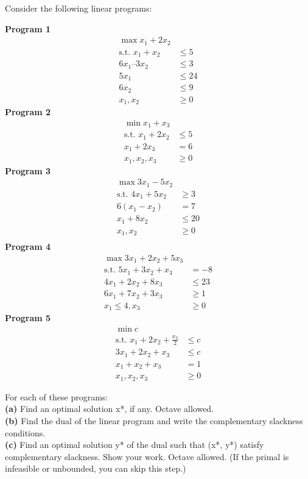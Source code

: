 \documentclass[fleqn]{homework}
\begin{document}
  \begin{problem}{2}
    \begin{question}
      Consider the following linear programs:
      \begin{multicols}{3}
      \noindent \textbf{Program 1}
      \begin{align*}
        \max x_1 + 2x_2 & \\
        \text{s.t.  } x_1 + x_2 &\le 5 \\
        6x_1 – 3x_2 &\le3 \\
        5x_1 &\le 24 \\
        6x_2 &\le 9 \\
        x_1, x_2 &\ge 0
      \end{align*}
      \textbf{Program 2}
      \begin{align*}
        \min x_1 + x_3 & \\
        \text{s.t.  } x_1 + 2x_2 &\le 5 \\
        x_1 + 2x_3 &= 6 \\
        x_1, x_2, x_3 &\ge 0
      \end{align*}
      \textbf{Program 3}
      \begin{align*}
        \max 3x_1 - 5x_2 & \\
        \text{s.t.  } 4x_1 + 5x_2 &\ge 3 \\
        6(x_1 - x_2) &= 7 \\
        x_1 + 8x_2 &\le 20 \\
        x_1, x_2 &\ge 0 \\
      \end{align*}
      \textbf{Program 4}
      \begin{align*}
        \max 3x_1 + 2x_2 + 5x_3 & \\
        \text{s.t.  } 5x_1 + 3x_2 + x_3 &= -8 \\
        4x_1 + 2x_2+ 8x_3 &\le 23 \\
        6x_1 + 7x_2 + 3x_3 &\ge 1 \\
        x_1 \le 4, x_3 &\ge 0
      \end{align*}
      \textbf{Program 5}
      \begin{align*}
        \min c & \\
        \text{s.t.  } x_1 + 2x_2 + \frac{x_3}{2} &\le c \\
        3x_1 + 2x_2 + x_3 &\le c \\
        x_1 + x_2 + x_3 &= 1 \\
        x_1, x_2, x_3 &\ge 0
      \end{align*}
      \end{multicols}
      For each of these programs:\\
      \textbf{(a)} Find an optimal solution x*, if any. Octave allowed.\\
      \textbf{(b)} Find the dual of the linear program and write the
      complementary slackness conditions.\\
      \textbf{(c)} Find an optimal solution y* of the dual such that (x*, y*)
      satisfy complementary slackness. Show your work.  Octave allowed. (If the
      primal is infeasible or unbounded, you can skip this step.)
    \end{question}


\end{problem}
\end{document}
